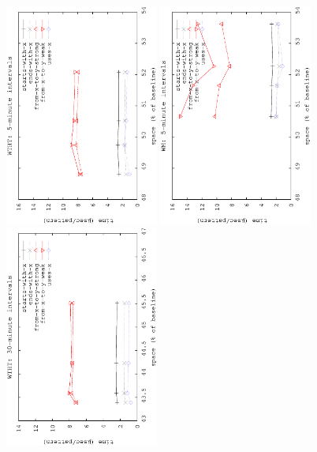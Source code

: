 \begin{figure}[!ht]
	\begin{center}
		{\includegraphics[angle=-90,width=0.45\textwidth]{figures_synt/porto_ht5.eps}}
		{\includegraphics[angle=-90,width=0.45\textwidth]{figures_synt/porto_wm5.eps}}
		{\includegraphics[angle=-90,width=0.45\textwidth]{figures_synt/porto_ht30.eps}}

\end{center}
\end{figure}
